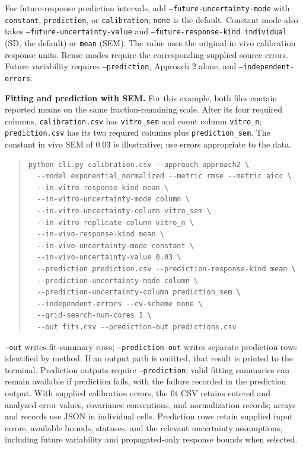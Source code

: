 For future-response prediction intervals, add \texttt{--future-uncertainty-mode} with \texttt{constant}, \texttt{prediction}, or \texttt{calibration}; \texttt{none} is the default. Constant mode also takes \texttt{--future-uncertainty-value} and \texttt{--future-response-kind individual} (SD, the default) or \texttt{mean} (SEM). The value uses the original in vivo calibration response units. Reuse modes require the corresponding supplied source errors. Future variability requires \texttt{--prediction}, Approach 2 alone, and \texttt{--independent-errors}.

\textbf{Fitting and prediction with SEM.} For this example, both files contain reported means on the same fraction-remaining scale. After its four required columns, \texttt{calibration.csv} has \texttt{vitro\_sem} and count column \texttt{vitro\_n}; \texttt{prediction.csv} has its two required columns plus \texttt{prediction\_sem}. The constant in vivo SEM of 0.03 is illustrative; use errors appropriate to the data.

\begin{quote}
\small
\begin{verbatim}
python cli.py calibration.csv --approach approach2 \
  --model exponential_normalized --metric rmse --metric aicc \
  --in-vitro-response-kind mean \
  --in-vitro-uncertainty-mode column \
  --in-vitro-uncertainty-column vitro_sem \
  --in-vitro-replicate-column vitro_n \
  --in-vivo-response-kind mean \
  --in-vivo-uncertainty-mode constant \
  --in-vivo-uncertainty-value 0.03 \
  --prediction prediction.csv --prediction-response-kind mean \
  --prediction-uncertainty-mode column \
  --prediction-uncertainty-column prediction_sem \
  --independent-errors --cv-scheme none \
  --grid-search-num-cores 1 \
  --out fits.csv --prediction-out predictions.csv
\end{verbatim}
\end{quote}

\texttt{--out} writes fit-summary rows; \texttt{--prediction-out} writes separate prediction rows identified by method. If an output path is omitted, that result is printed to the terminal. Prediction outputs require \texttt{--prediction}; valid fitting summaries can remain available if prediction fails, with the failure recorded in the prediction output. With supplied calibration errors, the fit CSV retains entered and analyzed error values, covariance conventions, and normalization records; arrays and records use JSON in individual cells. Prediction rows retain supplied input errors, available bounds, statuses, and the relevant uncertainty assumptions, including future variability and propagated-only response bounds when selected.

